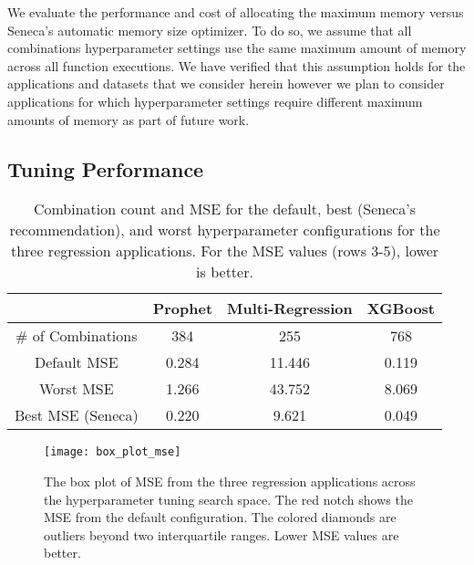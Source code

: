 We evaluate the performance and cost of allocating the maximum memory versus
Seneca's automatic memory size optimizer. To do so, we assume that all
combinations hyperparameter settings use the same maximum amount of memory
across all function executions. We have verified that this assumption holds
for the applications and datasets that we consider herein however we plan to
consider applications for which hyperparameter settings require different
maximum amounts of memory as part of future work.  

\subsection{Tuning Performance}

\begin{table}
\centering
\begin{tabular}{|c|c|c|c|}
\hline
& Prophet & Multi-Regression & XGBoost\\
\hline
\# of Combinations & 384 & 255 & 768\\
\hline
\hline
Default MSE & 0.284 & 11.446 & 0.119 \\
\hline
Worst MSE & 1.266 & 43.752 & 8.069 \\
\hline
Best MSE (Seneca) & 0.220 & 9.621 & 0.049 \\
\hline
\end{tabular}
\caption{Combination count and MSE for the default, 
best (Seneca's recommendation), 
and worst hyperparameter configurations for the three regression applications. 
For the MSE  values (rows 3-5), lower is better.
\label{tab:mse}}
\end{table}

\begin{figure}[t] \centering 
\texttt{[image: box\_plot\_mse]}
\caption{The box plot of MSE from the three regression applications 
across the hyperparameter tuning search space. 
The red notch shows the MSE from the default configuration. 
The colored diamonds are outliers beyond two interquartile ranges. 
Lower MSE values are better.
\label{fig:box_plot_mse}}
\vspace{-0.2in}
\end{figure}

